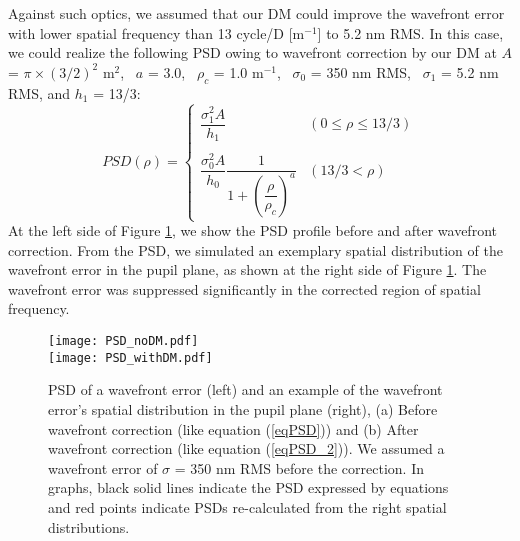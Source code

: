 \documentclass[a4paper]{article}
\begin{document}
Against such optics, we assumed that our DM could improve the wavefront error with lower spatial frequency than 13 cycle/D [m$^{-1}$] to 5.2 nm RMS. In this case, we could realize the following PSD owing to wavefront correction by our DM at $A$ = $\pi \times (3/2)^{2}$ m$^2$, ~$a$ = 3.0, ~$\rho_{c}$ = 1.0 m$^{-1}$, ~$\sigma_{0}$ = 350 nm RMS, ~$\sigma_{1}$ = 5.2 nm RMS, and $h_{1}$ = 13/3:
\begin{equation}
PSD(\rho) = \begin{cases}
               \dfrac{\sigma_{1}^{2} A}{h_{1}} & ( 0 \leq \rho \leq 13/3 ) \\
               \\
               \dfrac{\sigma_{0}^{2} A}{h_{0}} \dfrac{1}{1+ \left( \dfrac{\rho}{\rho_{c}} \right) ^{a}} & ( 13/3 < \rho )
            \end{cases}
            \label{eqPSD_2}
\end{equation}
At the left side of Figure \ref{PSD}, we show the PSD profile before and after wavefront correction. From the PSD, we simulated an exemplary spatial distribution of the wavefront error in the pupil plane, as shown at the right side of Figure \ref{PSD}. The wavefront error was suppressed significantly in the corrected region of spatial frequency.

\begin{figure}[htbp]
\centering
\texttt{[image: PSD\_noDM.pdf]}\\
\texttt{[image: PSD\_withDM.pdf]}
\caption{PSD of a wavefront error (left) and an example of the wavefront error's spatial distribution in the pupil plane (right), (a) Before wavefront correction (like equation (\ref{eqPSD})) and (b) After wavefront correction (like equation (\ref{eqPSD_2})). We assumed a wavefront error of $\sigma$ = 350 nm RMS before the correction. In graphs, black solid lines indicate the PSD expressed by equations and red points indicate PSDs re-calculated from the right spatial distributions.}
\label{PSD}
\end{figure}
\end{document}
